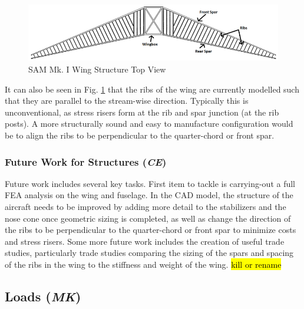 \begin{figure}[!h]
    \centering
    \includegraphics[width=\linewidth]{Photos/structuresandloads/Wing Structure.PNG}
    \caption{SAM Mk. I Wing Structure Top View}
    \label{fig:wing_structure}
\end{figure}
\FloatBarrier

It can also be seen in Fig. \ref{fig:wing_structure} that the ribs of the wing are currently modelled such that they are parallel to the stream-wise direction. Typically this is unconventional, as stress risers form at the rib and spar junction (at the rib posts). A more structurally sound and easy to manufacture configuration would be to align the ribs to be perpendicular to the quarter-chord or front spar.

\subsubsection{Future Work for Structures (\textit{CE})}
Future work includes several key tasks. First item to tackle is carrying-out a full FEA analysis on the wing and fuselage. In the CAD model, the structure of the aircraft needs to be improved by adding more detail to the stabilizers and the nose cone once geometric sizing is completed, as well as change the direction of the ribs to be perpendicular to the quarter-chord or front spar to minimize costs and stress risers. Some more future work includes the creation of useful trade studies, particularly trade studies comparing the sizing of the spars and spacing of the ribs in the wing to the stiffness and weight of the wing. \hl{kill or rename}

\subsection{Loads (\textit{MK})}
